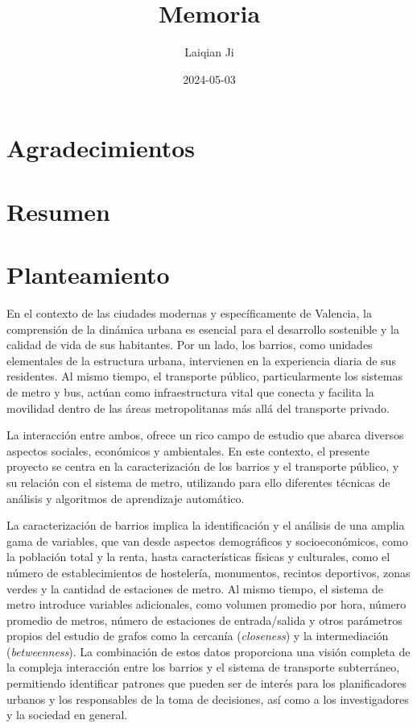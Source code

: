 \documentclass[
  10pt,
]{article}
\title{Memoria}
\author{Laiqian Ji}
\date{2024-05-03}
\begin{document}
\maketitle

{
\setcounter{tocdepth}{3}
\tableofcontents
}
\newpage
\section*{Agradecimientos}

\newpage
\section*{Resumen}

\hypertarget{planteamiento}{%
\section{Planteamiento}\label{planteamiento}}

En el contexto de las ciudades modernas y específicamente de Valencia,
la comprensión de la dinámica urbana es esencial para el desarrollo
sostenible y la calidad de vida de sus habitantes. Por un lado, los
barrios, como unidades elementales de la estructura urbana, intervienen
en la experiencia diaria de sus residentes. Al mismo tiempo, el
transporte público, particularmente los sistemas de metro y bus, actúan
como infraestructura vital que conecta y facilita la movilidad dentro de
las áreas metropolitanas más allá del transporte privado.

La interacción entre ambos, ofrece un rico campo de estudio que abarca
diversos aspectos sociales, económicos y ambientales. En este contexto,
el presente proyecto se centra en la caracterización de los barrios y el
transporte público, y su relación con el sistema de metro, utilizando
para ello diferentes técnicas de análisis y algoritmos de aprendizaje
automático.

La caracterización de barrios implica la identificación y el análisis de
una amplia gama de variables, que van desde aspectos demográficos y
socioeconómicos, como la población total y la renta, hasta
características físicas y culturales, como el número de establecimientos
de hostelería, monumentos, recintos deportivos, zonas verdes y la
cantidad de estaciones de metro. Al mismo tiempo, el sistema de metro
introduce variables adicionales, como volumen promedio por hora, número
promedio de metros, número de estaciones de entrada/salida y otros
parámetros propios del estudio de grafos como la cercanía
(\textit{closeness}) y la intermediación (\textit{betweenness}). La
combinación de estos datos proporciona una visión completa de la
compleja interacción entre los barrios y el sistema de transporte
subterráneo, permitiendo identificar patrones que pueden ser de interés
para los planificadores urbanos y los responsables de la toma de
decisiones, así como a los investigadores y la sociedad en general.
\end{document}

